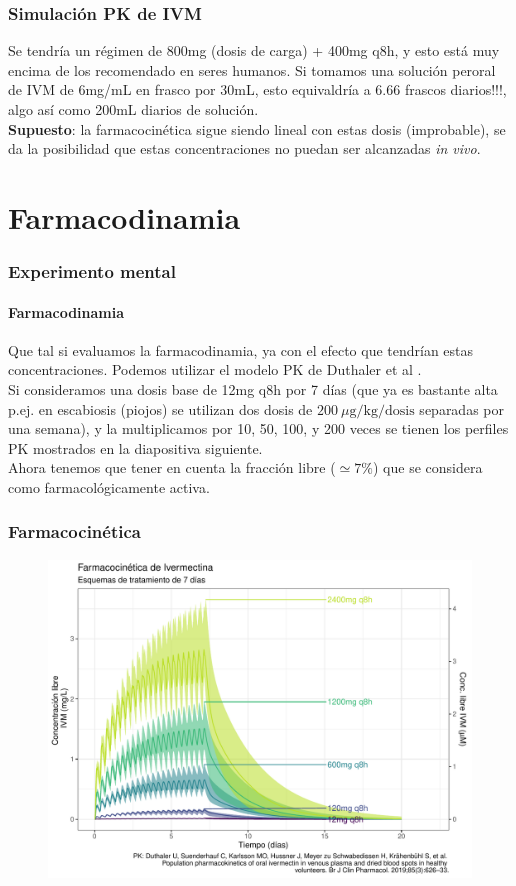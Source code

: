\documentclass[12pt,xcolor=dvipsnames]{beamer}
\begin{document}
	\begin{frame}
		\frametitle[Experimento mental]{Simulación PK de IVM}
		\small
		Se tendría un régimen de 800mg (dosis de carga) + 400mg q8h, y esto está muy encima de los recomendado en seres humanos. Si tomamos una solución peroral de IVM de 6mg/mL en frasco por 30mL, esto equivaldría a 6.66 frascos diarios!!!, algo así como 200mL diarios de solución. \\
		\vspace{4em}
		\textbf{Supuesto}: la farmacocinética sigue siendo lineal con estas dosis (improbable), se da la posibilidad que estas concentraciones no puedan ser alcanzadas \textit{in vivo}.
	\end{frame}
	
	\section{Farmacodinamia}
	
	\begin{frame}
		\frametitle[]{Experimento mental}\framesubtitle{Farmacodinamia}
		\small
		Que tal si evaluamos la farmacodinamia, ya con el efecto que tendrían estas concentraciones. Podemos utilizar el modelo PK de Duthaler et al \cite{Duthaler2019}. \\
		\vspace{2em}
		Si consideramos una dosis base de 12mg q8h por 7 días (que ya es bastante alta p.ej. en escabiosis (piojos) se utilizan dos dosis de $200~\mu\mathrm{g/kg/dosis}$ separadas por una semana), y la multiplicamos por 10, 50, 100, y 200 veces se tienen los perfiles PK mostrados en la diapositiva siguiente. \\
		\vspace{2em}
		Ahora tenemos que tener en cuenta la fracción libre ($\simeq 7\%$) que se considera como farmacológicamente activa. 
	\end{frame}

	\begin{frame}	
		\frametitle{Farmacocinética}			
		\begin{figure}
			\centering
			\includegraphics[width=0.9\linewidth]{../modelo_PD_2/figuras/G1}
			\label{fig:g1}
		\end{figure}
	\end{frame}
\end{document}
